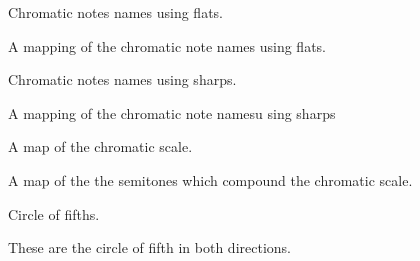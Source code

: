 \documentclass[letterpaper,10pt,english]{sphinxmanual}
\begin{document}
\begin{fulllineitems}
\label{\detokenize{birdears:birdears.CHROMATIC_FLAT}}
 \textendash{} Chromatic notes names using flats.

A mapping of the chromatic note names using flats.

\end{fulllineitems}


\begin{fulllineitems}
\label{\detokenize{birdears:birdears.CHROMATIC_SHARP}}
 \textendash{} Chromatic notes names using sharps.

A mapping of the chromatic note namesu sing sharps

\end{fulllineitems}


\begin{fulllineitems}
\label{\detokenize{birdears:birdears.CHROMATIC_TYPE}}
 \textendash{} A map of the chromatic scale.

A map of the the semitones which compound the chromatic scale.

\end{fulllineitems}


\begin{fulllineitems}
\label{\detokenize{birdears:birdears.CIRCLE_OF_FIFTHS}}
 \textendash{} Circle of fifths.

These are the circle of fifth in both directions.

\end{fulllineitems}
\end{document}
